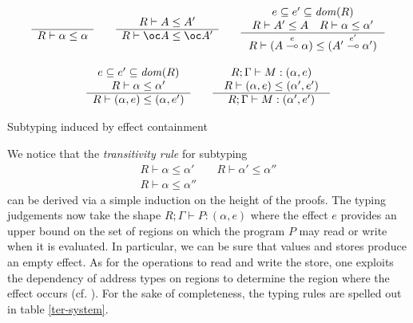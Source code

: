 \documentclass[11pt]{article}
\newcommand{\Gives}{\vdash}             \newcommand{\IGives}{\vdash_{I}}        \newcommand{\AIGives}{\vdash_{{\it AI}}} \newcommand{\CGives}{\vdash_{C}}
\newcommand{\limpe}[1]{\stackrel{#1}{\multimap}}
\newcommand{\infer}[2]{\begin{array}{c} #1 \\ \hline #2 \end{array}}
\begin{document}
\begin{table}
{\footnotesize
\[
\begin{array}{c}

\infer{}
{R\Gives \alpha\leq \alpha}
\qquad

\infer{R\Gives A\leq A'}
{R\Gives \bang A \leq \bang A'}

\qquad

\infer{\begin{array}{c}
e\subseteq e'\subseteq\w{dom}(R)\\
R\Gives A'\leq A \quad R\Gives \alpha\leq \alpha'
\end{array}}
{R\Gives (A\limpe{e}\alpha) \leq (A'\limpe{e'} \alpha')}\\ \\ 

\infer{\begin{array}{c}
e\subseteq e'\subseteq\w{dom}(R)\\
R\Gives \alpha\leq \alpha'
\end{array}}
{R\Gives (\alpha,e)\leq (\alpha,e')} 

\qquad

\infer{\begin{array}{c}
R;\Gamma\Gives M:(\alpha,e)\\ 
R\Gives (\alpha,e)\leq (\alpha',e')
\end{array}}
{R;\Gamma \Gives M:(\alpha',e')}

\end{array}
\]}
\caption{Subtyping induced by effect containment}\label{subtyping}
\end{table}

We notice that the {\em transitivity rule} for subtyping
\[
 \infer{R\Gives \alpha  \leq \alpha'\qquad R\Gives \alpha'\leq \alpha''}
 {R\Gives \alpha \leq  \alpha''}
 \]
can be derived via a simple induction on the height of the proofs.
The typing judgements now take the shape
$R;\Gamma \Gives P:(\alpha,e)$
where the effect $e$ provides an upper bound on the set of 
regions on which the program $P$ may read or write when it is
evaluated. In particular, we can be sure that values and stores
produce an empty effect. As for the operations to read and write
the store, one exploits the dependency of address types on regions
to determine the region where the effect occurs (cf. \cite{LG88}).
For the sake of completeness, the typing rules are spelled out
in table \ref{ter-system}. 
\end{document}
